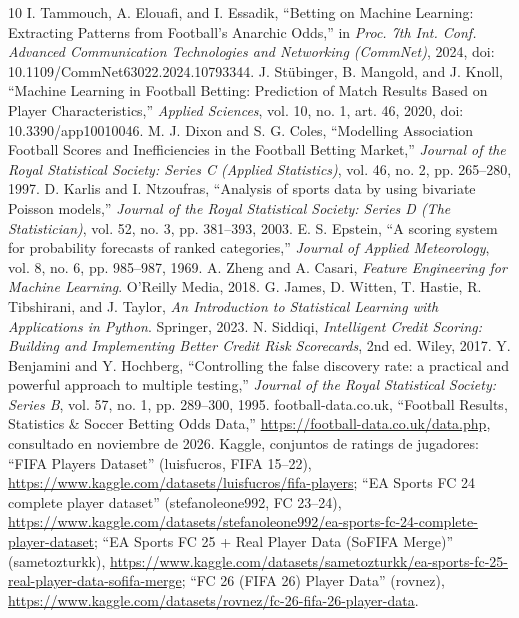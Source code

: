 \documentclass[conference]{IEEEtran}
\begin{document}
\FloatBarrier
\begin{thebibliography}{10}
 I. Tammouch, A. Elouafi, and I. Essadik, ``Betting on Machine Learning: Extracting Patterns from Football's Anarchic Odds,'' in \textit{Proc. 7th Int. Conf. Advanced Communication Technologies and Networking (CommNet)}, 2024, doi: 10.1109/CommNet63022.2024.10793344.
 J. Stübinger, B. Mangold, and J. Knoll, ``Machine Learning in Football Betting: Prediction of Match Results Based on Player Characteristics,'' \textit{Applied Sciences}, vol. 10, no. 1, art. 46, 2020, doi: 10.3390/app10010046.
 M. J. Dixon and S. G. Coles, ``Modelling Association Football Scores and Inefficiencies in the Football Betting Market,'' \textit{Journal of the Royal Statistical Society: Series C (Applied Statistics)}, vol. 46, no. 2, pp. 265--280, 1997.
 D. Karlis and I. Ntzoufras, ``Analysis of sports data by using bivariate Poisson models,'' \textit{Journal of the Royal Statistical Society: Series D (The Statistician)}, vol. 52, no. 3, pp. 381--393, 2003.
 E. S. Epstein, ``A scoring system for probability forecasts of ranked categories,'' \textit{Journal of Applied Meteorology}, vol. 8, no. 6, pp. 985--987, 1969.
 A. Zheng and A. Casari, \textit{Feature Engineering for Machine Learning}. O'Reilly Media, 2018.
 G. James, D. Witten, T. Hastie, R. Tibshirani, and J. Taylor, \textit{An Introduction to Statistical Learning with Applications in Python}. Springer, 2023.
 N. Siddiqi, \textit{Intelligent Credit Scoring: Building and Implementing Better Credit Risk Scorecards}, 2nd ed. Wiley, 2017.
 Y. Benjamini and Y. Hochberg, ``Controlling the false discovery rate: a practical and powerful approach to multiple testing,'' \textit{Journal of the Royal Statistical Society: Series B}, vol. 57, no. 1, pp. 289--300, 1995.
 football-data.co.uk, ``Football Results, Statistics \& Soccer Betting Odds Data,'' \url{https://football-data.co.uk/data.php}, consultado en noviembre de 2026.
 Kaggle, conjuntos de ratings de jugadores: ``FIFA Players Dataset'' (luisfucros, FIFA 15--22), \url{https://www.kaggle.com/datasets/luisfucros/fifa-players}; ``EA Sports FC 24 complete player dataset'' (stefanoleone992, FC 23--24), \url{https://www.kaggle.com/datasets/stefanoleone992/ea-sports-fc-24-complete-player-dataset}; ``EA Sports FC 25 + Real Player Data (SoFIFA Merge)'' (sametozturkk), \url{https://www.kaggle.com/datasets/sametozturkk/ea-sports-fc-25-real-player-data-sofifa-merge}; ``FC 26 (FIFA 26) Player Data'' (rovnez), \url{https://www.kaggle.com/datasets/rovnez/fc-26-fifa-26-player-data}.
\end{thebibliography}
\end{document}
